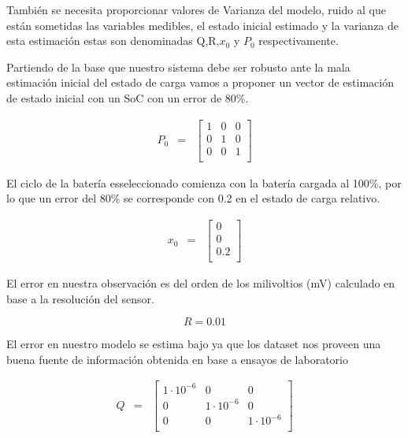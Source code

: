 \documentclass[10pt,a4paper]{article}
\begin{document}
También se necesita proporcionar valores de Varianza del modelo, ruido al que
están sometidas las variables medibles, el estado inicial estimado y la varianza
de esta estimación estas son denominadas Q,R,$x_0$ y $P_0$ respectivamente.

\noindent Partiendo de la base que nuestro sistema debe ser robusto ante la mala
estimación inicial del estado de carga vamos a proponer un vector de estimación
de estado inicial con un SoC con un error de 80\%.

\begin{equation}
    \begin{array}{llll}
	P_0 & = & \begin{bmatrix}
	    1 & 0 & 0 \\
	    0 & 1 & 0 \\
	    0 & 0 & 1 \\
	\end{bmatrix} 
    \end{array} \nonumber
\end{equation}

\noindent El ciclo de la batería esseleccionado comienza con la batería cargada
al 100\%, por lo que un error del 80\% se corresponde con 0.2 en el estado de
carga relativo.

\begin{equation}
    \begin{array}{llll}
	x_0 & = & \begin{bmatrix}
	    0 \\
	    0 \\
	    0.2 \\
	\end{bmatrix} 
    \end{array} \nonumber
\end{equation}

\noindent El error en nuestra observación es del orden de los milivoltios
(mV) calculado en base a la resolución del sensor.

\begin{equation}
    R = 0.01  \nonumber
\end{equation}

\noindent El error en nuestro modelo se estima bajo ya que los dataset nos 
proveen una buena fuente de información obtenida en base a ensayos de 
laboratorio

\begin{equation}
    \begin{array}{llll}
	Q & = & \begin{bmatrix}
	    1\cdot10^{-6} & 0 & 0 \\
	    0 & 1\cdot10^{-6} & 0 \\
	    0 & 0 & 1\cdot10^{-6} \\
	\end{bmatrix} 
    \end{array} \nonumber
\end{equation}
\end{document}

